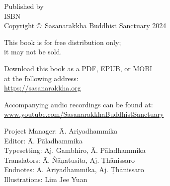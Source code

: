 
\cleartoverso
\thispagestyle{empty}

{%

	\ifafiveversion \fontsize{10}{16}\selectfont \fi
	\ifninebythirteenversion \fontsize{7.5}{11}\selectfont \fi
	\centering
	\setlength{\parindent}{0pt}%

	\ifafiveversion \vspace{0.5cm} \fi
	\ifninebythirteenversion \vspace{0.15cm} \fi

	Published by \publisher\\

	ISBN \theISBN\\
	Copyright \copyright\ Sāsanārakkha Buddhist Sanctuary 2024

	\ifafiveversion \vspace{0.5cm} \fi
	\ifninebythirteenversion \vspace{0.25cm} \fi

	This book is for free distribution only;\\
	it may not be sold.

	\ifafiveversion \vspace{0.5cm} \fi
	\ifninebythirteenversion \vspace{0.25cm} \fi

	Download this book as a PDF, EPUB, or MOBI\\
	at the following address:\\
	\href{https://sasanarakkha.org/}{https://sasanarakkha.org}

	Accompanying audio recordings can be found at: 
	\href{www.youtube.com/SasanarakkhaBuddhistSanctuary}{www.youtube.com/SasanarakkhaBuddhistSanctuary}

	\ifafiveversion \vspace{0.5cm} \fi
	\ifninebythirteenversion \vspace{0.25cm} \fi

	Project Manager: Ā. Ariyadhammika\\
	Editor: Ā. Pāladhammika\\
	Typesetting: Aj. Gambhiro, Ā. Pāladhammika\\
	Translators: Ā. Ñāṇatusita, Aj. Ṭhānissaro\\
	Endnotes: Ā. Ariyadhammika, Aj. Ṭhānissaro\\
	Illustrations: Lim Jee Yuan

	\ifafiveversion \vspace{0.5cm} \fi
	\ifninebythirteenversion \vspace{0.25cm} \fi

}
